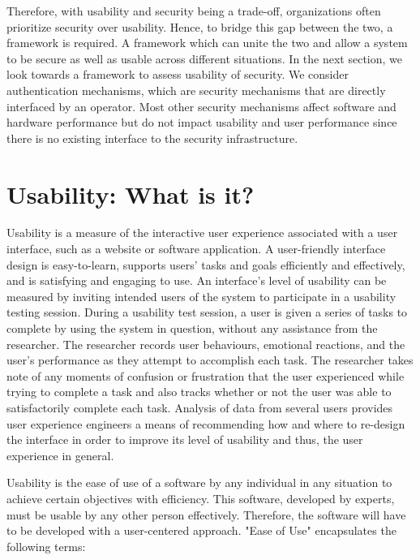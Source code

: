 \smallskip

Therefore, with usability and security being a trade-off, organizations often prioritize security over usability. Hence, to bridge this gap between the two, a framework is required. A framework which can unite the two and allow a system to be secure as well as usable across different situations. In the next section, we look towards a framework to assess usability of security. We consider authentication mechanisms, which are security mechanisms that are directly interfaced by an operator. Most other security mechanisms affect software and hardware performance but do not impact usability and user performance since there is no existing interface to the security infrastructure.

\section{Usability: What is it?}

Usability is a measure of the interactive user experience associated with a user interface, such as a website or software application. A user-friendly interface design is easy-to-learn, supports users' tasks and goals efficiently and effectively, and is satisfying and engaging to use.
\newline
An interface's level of usability can be measured by inviting intended users of the system to participate in a usability testing session. During a usability test session, a user is given a series of tasks to complete by using the system in question, without any assistance from the researcher. The researcher records user behaviours, emotional reactions, and the user's performance as they attempt to accomplish each task. The researcher takes note of any moments of confusion or frustration that the user experienced while trying to complete a task and also tracks whether or not the user was able to satisfactorily complete each task. Analysis of data from several users provides user experience engineers a means of recommending how and where to re-design the interface in order to improve its level of usability and thus, the user experience in general.

\smallskip

Usability is the ease of use of a software by any individual in any situation to achieve certain objectives with efficiency. This software, developed by experts, must be usable by any other person effectively. Therefore, the software will have to be developed with a user-centered approach. "Ease of Use" encapsulates the following terms:

